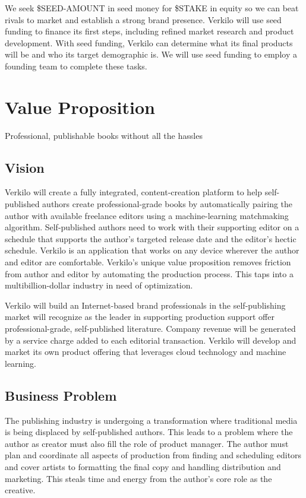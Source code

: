 \documentclass[10pt,openany]{book}
\begin{document}
We seek \$SEED-AMOUNT in seed money for \$STAKE in equity so we can beat
rivals to market and establish a strong brand presence. Verkilo will use
seed funding to finance its first steps, including refined market
research and product development. With seed funding, Verkilo can
determine what its final products will be and who its target demographic
is. We will use seed funding to employ a founding team to complete these
tasks.

\hypertarget{value-proposition}{%
\chapter{Value Proposition}\label{value-proposition}}

Professional, publishable books without all the hassles

\hypertarget{vision}{%
\section{Vision}\label{vision}}

Verkilo will create a fully integrated, content-creation platform to
help self-published authors create professional-grade books by
automatically pairing the author with available freelance editors using
a machine-learning matchmaking algorithm. Self-published authors need to
work with their supporting editor on a schedule that supports the
author's targeted release date and the editor's hectic schedule. Verkilo
is an application that works on any device wherever the author and
editor are comfortable. Verkilo's unique value proposition removes
friction from author and editor by automating the production process.
This taps into a multibillion-dollar industry in need of optimization.

Verkilo will build an Internet-based brand professionals in the
self-publishing market will recognize as the leader in supporting
production support offer professional-grade, self-published literature.
Company revenue will be generated by a service charge added to each
editorial transaction. Verkilo will develop and market its own product
offering that leverages cloud technology and machine learning.

\hypertarget{business-problem}{%
\section{Business Problem}\label{business-problem}}

The publishing industry is undergoing a transformation where traditional
media is being displaced by self-published authors. This leads to a
problem where the author as creator must also fill the role of product
manager. The author must plan and coordinate all aspects of production
from finding and scheduling editors and cover artists to formatting the
final copy and handling distribution and marketing. This steals time and
energy from the author's core role as the creative.
\end{document}
